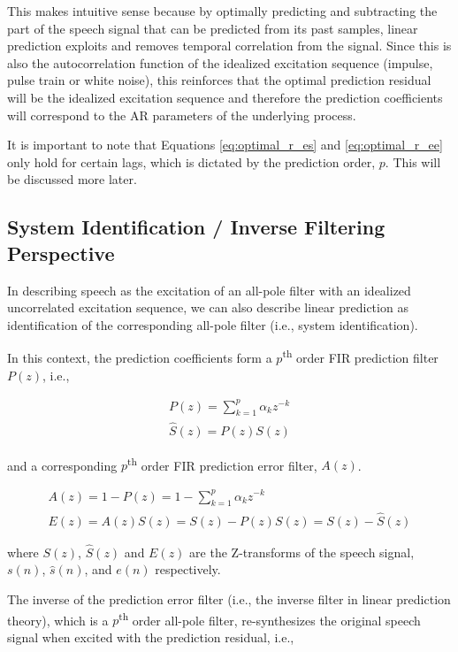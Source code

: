 This makes intuitive sense because by optimally predicting and subtracting the part of the speech signal that can be predicted from its past samples, linear prediction exploits and removes temporal correlation from the signal. Since this is also the autocorrelation function of the idealized excitation sequence (impulse, pulse train or white noise), this reinforces that the optimal prediction residual will be the idealized excitation sequence and therefore the prediction coefficients will correspond to the AR parameters of the underlying process.

It is important to note that Equations  \ref{eq:optimal_r_es} and \ref{eq:optimal_r_ee} only hold for certain lags, which is dictated by the prediction order, $p$. This will be discussed more later.


\subsection{System Identification / Inverse Filtering Perspective} \label{lp_inverse_filtering_perspective}

In describing speech as the excitation of an all-pole filter with an idealized uncorrelated excitation sequence, we can also describe linear prediction as identification of the corresponding all-pole filter (i.e., system identification). 

In this context, the prediction coefficients form a $p$\textsuperscript{th} order FIR prediction filter $P(z)$, i.e.,

\begin{eqnarray}
	P(z) = \sum_{k=1}^{p}\alpha_k z^{-k} \\
	\hat{S}(z) = P(z)S(z)
\end{eqnarray}

\noindent
and a corresponding $p$\textsuperscript{th} order FIR prediction error filter, $A(z)$.

\begin{eqnarray}
	A(z) = 1 - P(z) = 1 - \sum_{k=1}^{p}\alpha_k z^{-k} \\
	E(z) = A(z)S(z) = S(z) - P(z)S(z) = S(z) - \hat{S}(z)
\end{eqnarray}

\noindent
where $S(z)$, $\hat{S}(z)$ and $E(z)$ are the Z-transforms of the speech signal, $s(n)$, $\hat{s}(n)$, and $e(n)$ respectively.

The inverse of the prediction error filter (i.e., the inverse filter in linear prediction theory), which is a $p$\textsuperscript{th} order all-pole filter, re-synthesizes the original speech signal when excited with the prediction residual, i.e.,

